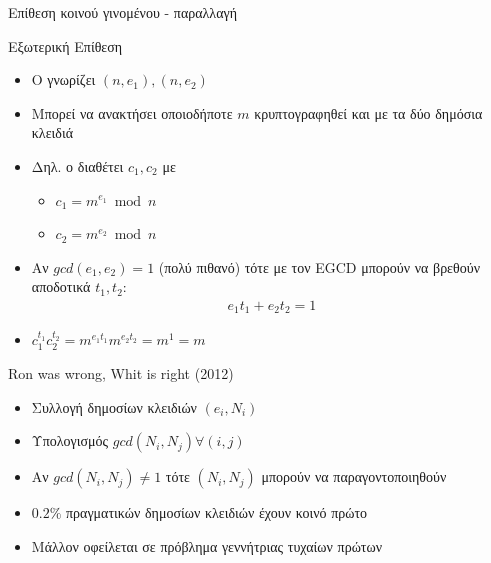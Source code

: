 \documentclass[handout]{beamer}
\begin{document}
\begin{frame}{Επίθεση κοινού γινομένου  - παραλλαγή}

Εξωτερική Επίθεση
\begin{itemize}
\item Ο \adv  γνωρίζει $(n,e_1),(n,e_2)$
\item Μπορεί να ανακτήσει οποιοδήποτε $m$ κρυπτογραφηθεί και με τα δύο δημόσια κλειδιά
\item Δηλ. ο \adv διαθέτει $c_1,c_2$ με
\begin{itemize}
\item $c_1 = m^{e_1} \bmod{n}$
\item $c_2 = m^{e_2} \bmod{n}$
\end{itemize}
\item Αν $gcd(e_1, e_2) = 1$ (πολύ πιθανό) τότε με τον EGCD μπορούν να βρεθούν αποδοτικά $t_1, t_2$:
\begin{align*}
e_1 t_1 + e_2 t_2 = 1
\end{align*} 
\item $c_1^{t_1}c_2^{t_2} = m^{e_1t_1}m^{e_2t_2}=m^{1}=m$
\end{itemize}
 
\end{frame}

\begin{frame}{Ron was wrong, Whit is right (2012)}
	\begin{itemize}
		\item Συλλογή δημοσίων κλειδιών $(e_i, N_i)$ \pause
		\item Υπολογισμός $gcd(N_i, N_j) \forall (i,j)$ \pause
		\item Αν $gcd(N_i, N_j) \neq 1$ τότε $(N_i, N_j)$ μπορούν να παραγοντοποιηθούν \pause \pause
		\item $0.2\%$ πραγματικών δημοσίων κλειδιών έχουν κοινό πρώτο \pause
		\item Μάλλον οφείλεται σε πρόβλημα γεννήτριας τυχαίων πρώτων
	\end{itemize}
\end{frame}
\end{document}
